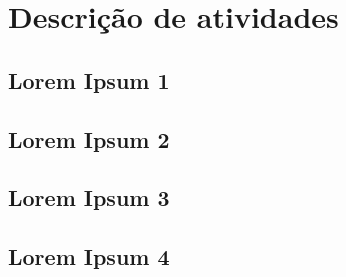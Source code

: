 \chapter{Descrição de atividades}

\section{Lorem Ipsum 1}

\lipsum[1-4]

\section{Lorem Ipsum 2}

\lipsum[1-4]

\section{Lorem Ipsum 3}

\lipsum[1-4]

\section{Lorem Ipsum 4}

\lipsum[1-4]


